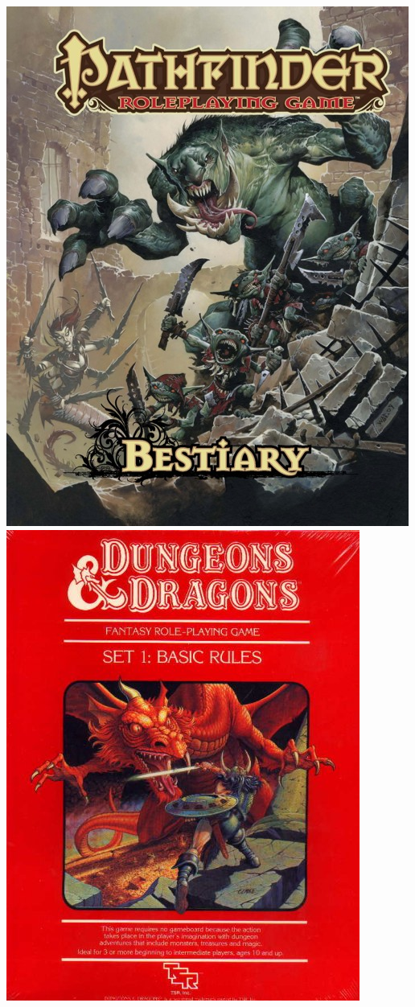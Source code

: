\documentclass{beamer}\usepackage{graphicx, color}
\begin{document}
\begin{frame}
\begin{center}
  \includegraphics[height = 0.4\textheight, keepaspectratio = true]{path}\hspace{0.2\textwidth}%
  \includegraphics[height = 0.4\textheight, keepaspectratio = true]{redbox}\par
  \end{center}


\end{frame}
\end{document}
